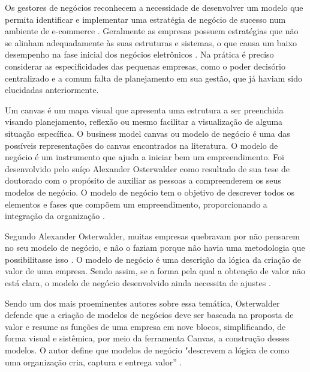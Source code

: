 Os gestores de negócios reconhecem a necessidade de desenvolver um modelo que permita identificar e implementar uma estratégia de negócio de sucesso num ambiente de e-commerce \cite{modelneg2012}. Geralmente as empresas possuem estratégias que não se alinham adequadamente às suas estruturas e sistemas, o que causa um baixo desempenho na fase inicial dos negócios eletrônicos \cite{modelneg2013}. Na prática é preciso considerar as especificidades das pequenas empresas, como o poder decisório centralizado e a comum falta de planejamento em sua gestão, que já haviam sido elucidadas anteriormente.

Um canvas é um mapa visual que apresenta uma estrutura a ser preenchida visando planejamento, reflexão ou mesmo facilitar a visualização de alguma situação específica. O business model canvas ou modelo de negócio é uma das possíveis representações do canvas encontrados na literatura. O modelo de negócio é um instrumento que ajuda a iniciar bem um empreendimento. Foi desenvolvido pelo suíço Alexander Osterwalder como resultado de sua tese de doutorado com o propósito de auxiliar as pessoas a compreenderem os seus modelos de negócio. O modelo de negócio tem o objetivo de descrever todos os elementos e fases que compõem um empreendimento, proporcionando a integração da organização \cite{sebrae2018}. 

Segundo Alexander Osterwalder, muitas empresas quebravam por não pensarem no seu modelo de negócio, e não o faziam porque não havia uma metodologia que possibilitasse isso \cite{exameplanmodel}. O modelo de negócio é uma descrição da lógica da criação de valor de uma empresa. Sendo assim, se a forma pela qual a obtenção de valor não está clara, o modelo de negócio desenvolvido ainda necessita de ajustes \cite{modelneg2013}. 

Sendo um dos mais proeminentes autores sobre essa temática, Osterwalder defende que a criação de modelos de negócios deve ser baseada na proposta de valor e resume as funções de uma empresa em nove blocos, simplificando, de forma visual e sistêmica, por meio da ferramenta Canvas, a construção desses modelos. O autor define que modelos de negócio "descrevem a lógica de como uma organização cria, captura e entrega valor” \cite{ecombrasil2013}.


